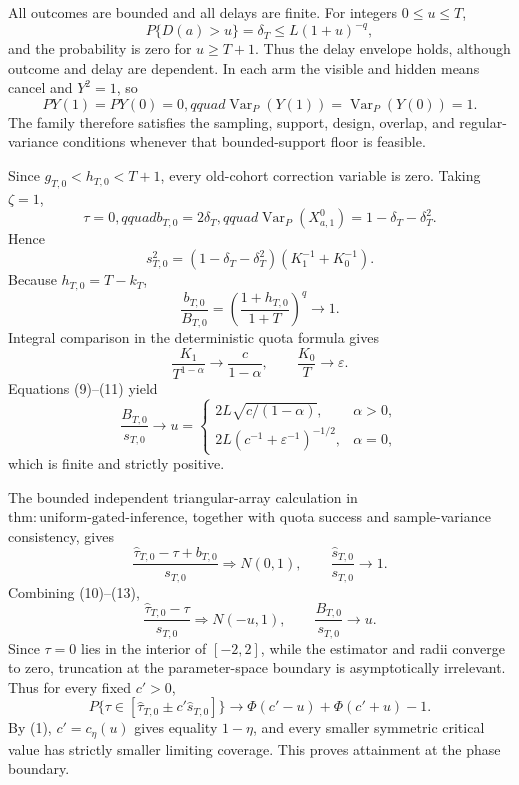 All outcomes are bounded and all delays are finite.  For integers \(0\leq u\leq T\),
\[
 P\{D(a)>u\}=\delta_T\leq L(1+u)^{-q}, \tag{6}
\]
and the probability is zero for \(u\geq T+1\).  Thus the delay envelope holds, although outcome and delay are dependent.  In each arm the visible and hidden means cancel and \(Y^2=1\), so
\[
 PY(1)=PY(0)=0,qquad
 \operatorname{Var}_P(Y(1))=\operatorname{Var}_P(Y(0))=1. \tag{7}
\]
The family therefore satisfies the sampling, support, design, overlap, and regular-variance conditions whenever that bounded-support floor is feasible.

Since \(g_{T,0}<h_{T,0}<T+1\), every old-cohort correction variable is zero.  Taking \(\zeta=1\),
\[
 \tau=0,qquad b_{T,0}=2\delta_T,qquad
 \operatorname{Var}_P(X_{a,1}^{0})=1-\delta_T-\delta_T^2. \tag{8}
\]
Hence
\[
 s_{T,0}^2=(1-\delta_T-\delta_T^2)(K_1^{-1}+K_0^{-1}). \tag{9}
\]
Because \(h_{T,0}=T-k_T\),
\[
 \frac{b_{T,0}}{B_{T,0}}
 =\left(\frac{1+h_{T,0}}{1+T}\right)^q\longrightarrow1. \tag{10}
\]
Integral comparison in the deterministic quota formula gives
\[
 \frac{K_1}{T^{1-\alpha}}\longrightarrow\frac{c}{1-\alpha},
 \qquad \frac{K_0}{T}\longrightarrow\varepsilon. \tag{11}
\]
Equations (9)--(11) yield
\[
 \frac{B_{T,0}}{s_{T,0}}\longrightarrow u=
 \begin{cases}
 2L\sqrt{c/(1-\alpha)},&\alpha>0,\\
 2L(c^{-1}+\varepsilon^{-1})^{-1/2},&\alpha=0,
 \end{cases} \tag{12}
\]
which is finite and strictly positive.

The bounded independent triangular-array calculation in \(\mathrm{thm:uniform\text{-}gated\text{-}inference}\), together with quota success and sample-variance consistency, gives
\[
 \frac{\widehat\tau_{T,0}-\tau+b_{T,0}}{s_{T,0}}\Rightarrow N(0,1),
 \qquad \frac{\widehat s_{T,0}}{s_{T,0}}\longrightarrow1. \tag{13}
\]
Combining (10)--(13),
\[
 \frac{\widehat\tau_{T,0}-\tau}{s_{T,0}}\Rightarrow N(-u,1),
 \qquad \frac{B_{T,0}}{s_{T,0}}\longrightarrow u. \tag{14}
\]
Since \(\tau=0\) lies in the interior of \([-2,2]\), while the estimator and radii converge to zero, truncation at the parameter-space boundary is asymptotically irrelevant.  Thus for every fixed \(c'>0\),
\[
 P\{\tau\in[\widehat\tau_{T,0}\pm c'\widehat s_{T,0}]\}
 \longrightarrow\Phi(c'-u)+\Phi(c'+u)-1. \tag{15}
\]
By (1), \(c'=c_\eta(u)\) gives equality \(1-\eta\), and every smaller symmetric critical value has strictly smaller limiting coverage.  This proves attainment at the phase boundary.

